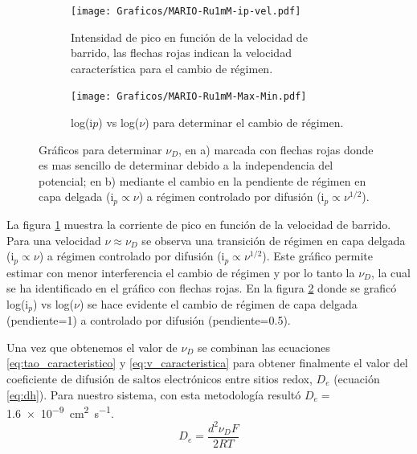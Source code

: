          	 \begin{figure}[ht]
			 	 \begin{subfigure}[t]{0.5\textwidth}
			 	 \texttt{[image: Graficos/MARIO-Ru1mM-ip-vel.pdf]}
				  \caption{Intensidad de pico  en función de la velocidad de barrido, las flechas rojas indican la velocidad característica para el cambio de régimen.}
			 	 \label{fig:ip-vel}
		  	  	 \end{subfigure}	
			 	 \begin{subfigure}[t]{0.5\textwidth}
			  	 \texttt{[image: Graficos/MARIO-Ru1mM-Max-Min.pdf]}
			  	 \caption{log(i$p$) vs log($\nu$) para determinar el cambio de régimen.}
			 	 \label{fig:logj-logv}
		  		 \end{subfigure}
				  \caption[Cálculo de velocidad de barrido característica]{Gráficos para determinar $\nu_{\scriptscriptstyle{D}}$, en a) marcada con flechas rojas donde es mas sencillo de determinar debido a la independencia del potencial; en b) mediante el cambio en la pendiente de  régimen en capa delgada ($\text{i}_{p} \propto \nu$) a régimen controlado por difusión ($\text{i}_{p} \propto \nu^{1/2}$).}
			 	 \label{fig:ip-vel2}
			 	 \end{figure}

         La figura \ref{fig:ip-vel} muestra la corriente de pico en función de la velocidad de barrido. Para una velocidad $\nu \approx \nu_{\scriptscriptstyle{D}}$ se observa una transición de régimen en capa delgada ($\text{i}_{p} \propto \nu$) a régimen controlado por difusión ($\text{i}_{p} \propto \nu^{1/2}$). Este gráfico permite estimar con menor interferencia el cambio de régimen y por lo tanto la $\nu_{\scriptscriptstyle{D}}$, la cual se ha identificado en el gráfico con flechas rojas. En la figura \ref{fig:logj-logv} donde se graficó log({i$_p$}) vs log({$\nu$}) se hace evidente el cambio de régimen de capa delgada (pendiente=1) a controlado por difusión (pendiente=0.5).

		 Una vez que obtenemos el valor de  $\nu_{\scriptscriptstyle{D}}$ se combinan las ecuaciones \ref{eq:tao_caracteristico} y \ref{eq:v_caracteristica} para obtener finalmente el valor del coeficiente de difusión de saltos electrónicos entre sitios redox,  $D_e$ (ecuación \ref{eq:dh}). Para nuestro sistema, con esta metodología resultó $D_e=$\SI{1.6e-9}{\square\cm\per\second}.  
			\begin{equation}
					D_e= \frac{d^2\nu_{\scriptscriptstyle{D}}F}{2RT}
					\label{eq:dh}
			\end{equation}
     
